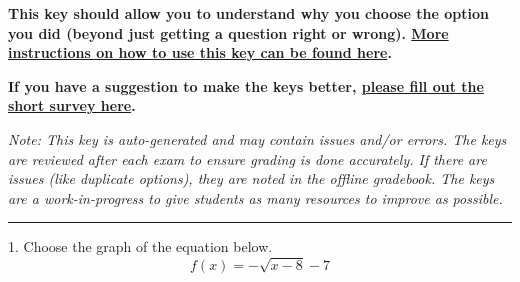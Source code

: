 \documentclass{extbook}[14pt]
\begin{document}
\textbf{This key should allow you to understand why you choose the option you did (beyond just getting a question right or wrong). \href{https://xronos.clas.ufl.edu/mac1105spring2020/courseDescriptionAndMisc/Exams/LearningFromResults}{More instructions on how to use this key can be found here}.}

\textbf{If you have a suggestion to make the keys better, \href{https://forms.gle/CZkbZmPbC9XALEE88}{please fill out the short survey here}.}

\textit{Note: This key is auto-generated and may contain issues and/or errors. The keys are reviewed after each exam to ensure grading is done accurately. If there are issues (like duplicate options), they are noted in the offline gradebook. The keys are a work-in-progress to give students as many resources to improve as possible.}

\rule{\textwidth}{0.4pt}

1. Choose the graph of the equation below.
\[ f(x) = - \sqrt{x - 8} - 7 \] 
\end{document}
